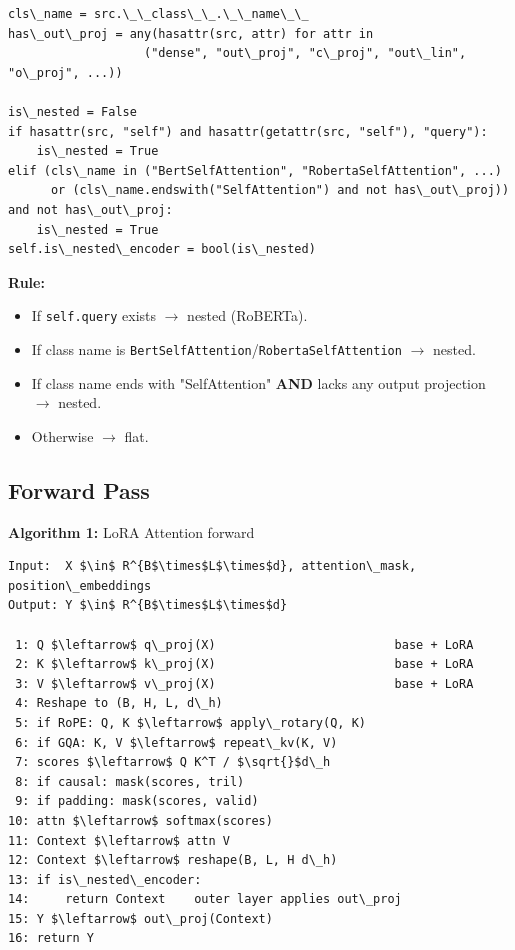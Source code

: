 \begin{lstlisting}
cls\_name = src.\_\_class\_\_.\_\_name\_\_
has\_out\_proj = any(hasattr(src, attr) for attr in 
                   ("dense", "out\_proj", "c\_proj", "out\_lin", "o\_proj", ...))

is\_nested = False
if hasattr(src, "self") and hasattr(getattr(src, "self"), "query"):
    is\_nested = True
elif (cls\_name in ("BertSelfAttention", "RobertaSelfAttention", ...)
      or (cls\_name.endswith("SelfAttention") and not has\_out\_proj)) and not has\_out\_proj:
    is\_nested = True
self.is\_nested\_encoder = bool(is\_nested)
\end{lstlisting}

\textbf{Rule:}
\begin{itemize}
\item If \texttt{self.query} exists $\to$ nested (RoBERTa).
\item If class name is \texttt{BertSelfAttention}/\texttt{RobertaSelfAttention} $\to$ nested.
\item If class name ends with "SelfAttention" \textbf{AND} lacks any output projection $\to$ nested.
\item Otherwise $\to$ flat.

\end{itemize}
\subsection{Forward Pass}

\textbf{Algorithm 1:} LoRA Attention forward
\begin{lstlisting}
Input:  X $\in$ R^{B$\times$L$\times$d}, attention\_mask, position\_embeddings
Output: Y $\in$ R^{B$\times$L$\times$d}

 1: Q $\leftarrow$ q\_proj(X)                         base + LoRA
 2: K $\leftarrow$ k\_proj(X)                         base + LoRA
 3: V $\leftarrow$ v\_proj(X)                         base + LoRA
 4: Reshape to (B, H, L, d\_h)
 5: if RoPE: Q, K $\leftarrow$ apply\_rotary(Q, K)
 6: if GQA: K, V $\leftarrow$ repeat\_kv(K, V)
 7: scores $\leftarrow$ Q K^T / $\sqrt{}$d\_h
 8: if causal: mask(scores, tril)
 9: if padding: mask(scores, valid)
10: attn $\leftarrow$ softmax(scores)
11: Context $\leftarrow$ attn V
12: Context $\leftarrow$ reshape(B, L, H d\_h)
13: if is\_nested\_encoder:
14:     return Context    outer layer applies out\_proj
15: Y $\leftarrow$ out\_proj(Context)
16: return Y
\end{lstlisting}

